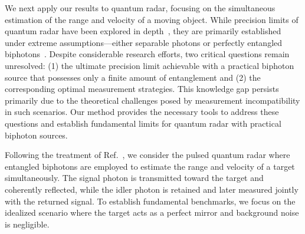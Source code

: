 \documentclass[
aps,
prl,
twocolumn,

superscriptaddress]{revtex4-2}
\begin{document}
We next apply our results to quantum radar, focusing on the simultaneous estimation of the range and velocity of a moving object.
While precision limits of quantum radar have been explored in depth~\cite{zhuang2017,zhuang2021,zhuang2022,huang2021,quantumradar2020,Maccone2020,reichert2022quantum,reichert2024heisenberg,li2023entanglement}, they are primarily established under extreme assumptions—either separable photons or perfectly entangled biphotons~\cite{zhuang2017,huang2021}.
Despite considerable research efforts, two critical questions remain unresolved: (1) the ultimate precision limit achievable with a practical biphoton source that possesses only a finite amount of entanglement and (2) the corresponding optimal measurement strategies. This knowledge gap persists primarily due to the theoretical challenges posed by measurement incompatibility in such scenarios. Our method provides the necessary tools to address these questions and establish fundamental limits for quantum radar with practical biphoton sources.

Following the treatment of Ref.~\cite{huang2021}, we consider the pulsed quantum radar where entangled biphotons are employed to estimate the range and velocity of a target simultaneously. The signal photon is transmitted toward the target and coherently reflected, while the idler photon is retained and later measured jointly with the returned signal. To establish fundamental benchmarks, we focus on the idealized scenario where the target acts as a perfect mirror and background noise is negligible.
\end{document}
